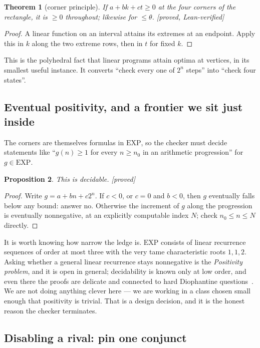 \documentclass[11pt,a4paper]{article}
\theoremstyle{plain}
\newtheorem{theorem}{Theorem}[section]
\newtheorem{proposition}[theorem]{Proposition}
\theoremstyle{definition}
\newcommand{\Proved}{\textcolor{linkc}{\textsf{[proved]}}}
\newcommand{\Lean}{\textcolor{linkc}{\textsf{[proved, Lean-verified]}}}
\begin{document}
\begin{theorem}[corner principle]\label{thm:B}
If $a + bk + ct \ge 0$ at the four corners of the rectangle, it is
$\ge 0$ throughout; likewise for $\le \theta$. \Lean
\end{theorem}
\begin{proof}
A linear function on an interval attains its extremes at an endpoint.
Apply this in $k$ along the two extreme rows, then in $t$ for fixed $k$.
\end{proof}

This is the polyhedral fact that linear programs attain optima at
vertices, in its smallest useful instance. It converts ``check every one
of $2^{n}$ steps'' into ``check four states''.

\subsection{Eventual positivity, and a frontier we sit just inside}

The corners are themselves formulas in $\mathrm{EXP}$, so the checker
must decide statements like ``$g(n) \ge 1$ for every $n \ge n_0$ in an
arithmetic progression'' for $g \in \mathrm{EXP}$.

\begin{proposition}\label{prop:evpos}
This is decidable. \Proved
\end{proposition}
\begin{proof}
Write $g = a + bn + c2^{n}$. If $c < 0$, or $c = 0$ and $b < 0$, then $g$
eventually falls below any bound: answer no. Otherwise the increment of
$g$ along the progression is eventually nonnegative, at an explicitly
computable index $N$; check $n_0 \le n \le N$ directly.
\end{proof}

It is worth knowing how narrow the ledge is. $\mathrm{EXP}$ consists of
linear recurrence sequences of order at most three with the very tame
characteristic roots $1, 1, 2$. Asking whether a general linear recurrence
stays nonnegative is the \emph{Positivity problem}, and it is open in
general; decidability is known only at low order, and even there the
proofs are delicate and connected to hard Diophantine
questions~\cite{ouaknineworrell}. We are not doing anything clever
here --- we are working in a class chosen small enough that positivity is
trivial. That is a design decision, and it is the honest reason the
checker terminates.

\subsection{Disabling a rival: pin one conjunct}
\end{document}
